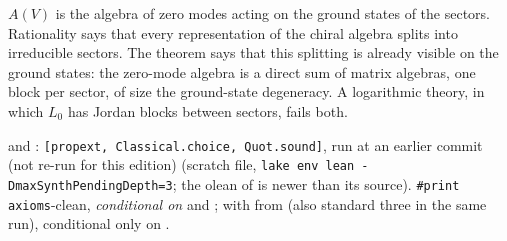 \begin{physics}
$A(V)$ is the algebra of zero modes acting on the ground states of the sectors. Rationality says that every representation of
the chiral algebra splits into irreducible sectors. The theorem says that this splitting is already visible on the ground
states: the zero-mode algebra is a direct sum of matrix algebras, one block per sector, of size the ground-state degeneracy.
A logarithmic theory, in which $L_0$ has Jordan blocks between sectors, fails both.
\end{physics}

\begin{status}
\allowbreak{}\allowbreak{}\allowbreak{} and
\allowbreak{}: \texttt{[propext, Classical.choice, Quot.sound]}, run at
an earlier commit (not re-run for this edition) (scratch file, \texttt{lake env lean -DmaxSynthPendingDepth=3}; the olean of
 is newer than its source). \texttt{\#print axioms}-clean, \emph{conditional on}  and
; with  from  (also standard three in the same run),
conditional only on .
\end{status}

